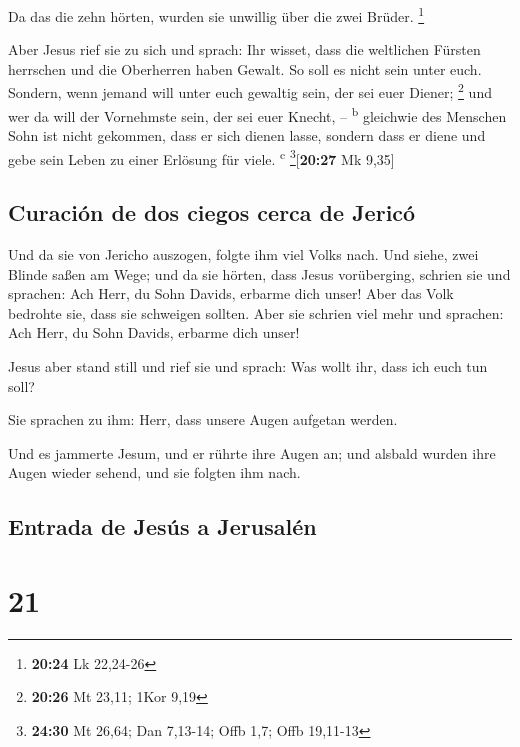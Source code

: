  Da das die zehn hörten, wurden sie unwillig über die
zwei Brüder. \footnote{\textbf{20:24} Lk 22,24-26}

 Aber Jesus rief sie zu sich und sprach: Ihr wisset, dass
die weltlichen Fürsten herrschen und die Oberherren haben Gewalt.
 So soll es nicht sein unter euch. Sondern, wenn jemand
will unter euch gewaltig sein, der sei euer Diener; \footnote{\textbf{20:26}
  Mt 23,11; 1Kor 9,19}  und wer da will der Vornehmste
sein, der sei euer Knecht, -- \textsuperscript{b} 
gleichwie des Menschen Sohn ist nicht gekommen, dass er sich dienen
lasse, sondern dass er diene und gebe sein Leben zu einer Erlösung für
viele. \textsuperscript{c} \footnote{\textbf{24:30} Mt 26,64; Dan
  7,13-14; Offb 1,7; Offb 19,11-13}{[}\textbf{20:27} Mk 9,35{]}

\hypertarget{curaciuxf3n-de-dos-ciegos-cerca-de-jericuxf3}{%
\subsection{Curación de dos ciegos cerca de
Jericó}\label{curaciuxf3n-de-dos-ciegos-cerca-de-jericuxf3}}

 Und da sie von Jericho auszogen, folgte ihm viel Volks
nach.  Und siehe, zwei Blinde saßen am Wege; und da sie
hörten, dass Jesus vorüberging, schrien sie und sprachen: Ach Herr, du
Sohn Davids, erbarme dich unser!  Aber das Volk bedrohte
sie, dass sie schweigen sollten. Aber sie schrien viel mehr und
sprachen: Ach Herr, du Sohn Davids, erbarme dich unser!

 Jesus aber stand still und rief sie und sprach: Was
wollt ihr, dass ich euch tun soll?

 Sie sprachen zu ihm: Herr, dass unsere Augen aufgetan
werden.

 Und es jammerte Jesum, und er rührte ihre Augen an; und
alsbald wurden ihre Augen wieder sehend, und sie folgten ihm nach.

\hypertarget{entrada-de-jesuxfas-a-jerusaluxe9n}{%
\subsection{Entrada de Jesús a
Jerusalén}\label{entrada-de-jesuxfas-a-jerusaluxe9n}}

\hypertarget{section-20}{%
\section{21}\label{section-20}}

